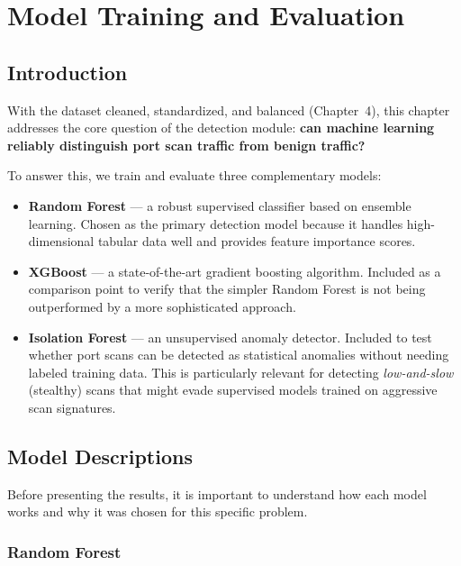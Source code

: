 
\chapter{Model Training and Evaluation}

\section{Introduction}

With the dataset cleaned, standardized, and balanced (Chapter~4), this chapter addresses the core question of the detection module: \textbf{can machine learning reliably distinguish port scan traffic from benign traffic?}

To answer this, we train and evaluate three complementary models:

\begin{itemize}
    \item \textbf{Random Forest} --- a robust supervised classifier based on ensemble learning. Chosen as the primary detection model because it handles high-dimensional tabular data well and provides feature importance scores.
    \item \textbf{XGBoost} --- a state-of-the-art gradient boosting algorithm. Included as a comparison point to verify that the simpler Random Forest is not being outperformed by a more sophisticated approach.
    \item \textbf{Isolation Forest} --- an unsupervised anomaly detector. Included to test whether port scans can be detected as statistical anomalies without needing labeled training data. This is particularly relevant for detecting \textit{low-and-slow} (stealthy) scans that might evade supervised models trained on aggressive scan signatures.
\end{itemize}

\section{Model Descriptions}

Before presenting the results, it is important to understand how each model works and why it was chosen for this specific problem.

\subsection{Random Forest}

